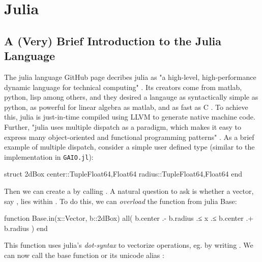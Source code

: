 \section{Julia}


\subsection{A (Very) Brief Introduction to the Julia Language}

The julia language GitHub page decribes julia as "a high-level, high-performance dynamic 
language for technical computing" \cite*{juliarepo}. Its creators come from matlab, python,
lisp among others, and they desired a langauge as syntactically simple as python, as 
powerful for linear algebra as matlab, and as fast as C \cite*{julia}. To achieve this,
julia is just-in-time compiled using LLVM to generate native machine code. Further, "julia uses 
multiple dispatch as a paradigm, which makes it easy to express many object-oriented and
functional programming patterns" \cite*{juliamain}. As a brief example of multiple dispatch,
consider a simple user defined type  (similar to the implementation in 
\texttt{GAIO.jl}):

\begin{minipage}{\linewidth}
\begin{jllisting}[language=julia, style=jlcodestyle]
    struct 2dBox
        center::Tuple{Float64,Float64}
        radius::Tuple{Float64,Float64}
    end
\end{jllisting}
\end{minipage}

Then we can create a  by calling . 
A natural question to ask is whether a vector, say , lies within 
. To do this, we can \emph{overload} the function  from julia Base:

\begin{minipage}{\linewidth}
\begin{jllisting}[language=julia, style=jlcodestyle]
    function Base.in(x::Vector, b::2dBox)
        all( b.center .- b.radius .≤ x .≤ b.center .+ b.radius )
    end
\end{jllisting}
\end{minipage}

This function uses julia's \emph{dot-syntax} to vectorize operations, eg. \jlinl{+}
by writing . We can now call the base function  or its unicode alias
:

